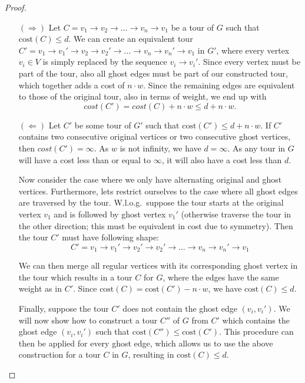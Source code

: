 \documentclass{article}
\begin{document}
\begin{proof}
    \begin{itemize}
        \item[$(\Rightarrow)$]  Let $C = v_1 \rightarrow v_2 \rightarrow \dots \rightarrow v_n \rightarrow v_1$ be a tour of $G$ such that $\text{cost}(C) \le d$. We can create an equivalent tour $C' = v_1 \rightarrow v_1' \rightarrow v_2\rightarrow v_2' \rightarrow \dots \rightarrow v_n \rightarrow v_n' \rightarrow v_1$ in $G'$, where every vertex $v_i \in V$ is simply replaced by the sequence $v_i \rightarrow v_i'$. Since every vertex must be part of the tour, also all ghost edges must be part of our constructed tour, which together adds a cost of $n \cdot w$. Since the remaining edges are equivalent to those of the original tour, also in terms of weight, we end up with \[cost(C') = cost(C) + n \cdot w \le d + n \cdot w.\]

        \item [$(\Leftarrow)$] Let $C'$ be some tour of $G'$ such that $\text{cost}(C') \le d + n \cdot w$. If $C'$ contains two consecutive original vertices or two consecutive ghost vertices, then $cost(C') = \infty$. As $w$ is not infinity, we have $d = \infty$. As any tour in $G$ will have a cost less than or equal to $\infty$, it will also have a cost less than $d$. 
        
        Now consider the case where we only have alternating original and ghost vertices. Furthermore, lets restrict ourselves to the case where all ghost edges are traversed by the tour. W.l.o.g.~suppose the tour starts at the original vertex $v_1$ and is followed by ghost vertex $v_1'$ (otherwise traverse the tour in the other direction; this must be equivalent in cost due to symmetry). Then the tour $C'$ must have following shape:
        \[
            C' = v_1 \rightarrow v_1' \rightarrow v_2'\rightarrow v_2' \rightarrow \dots \rightarrow v_n \rightarrow v_n' \rightarrow v_1
        \]
        
        We can then merge all regular vertices with its corresponding ghost vertex in the tour which results in a tour $C$ for $G$, where the edges have the same weight as in $C'$. Since $\text{cost}(C) = \text{cost}(C') - n \cdot w$, we have $\text{cost}(C) \le d$.

        Finally, suppose the tour $C'$ does not contain the ghost edge $(v_i, v_i')$. We will now show how to construct a tour $C''$ of $G$ from $C'$ which contains the ghost edge $(v_i, v_i')$ such that $\text{cost}(C'') \le \text{cost}(C')$. This procedure can then be applied for every ghost edge, which allows us to use the above construction for a tour $C$ in $G$, resulting in $\text{cost}(C) \le d$.


\end{itemize}
\end{proof}
\end{document}
